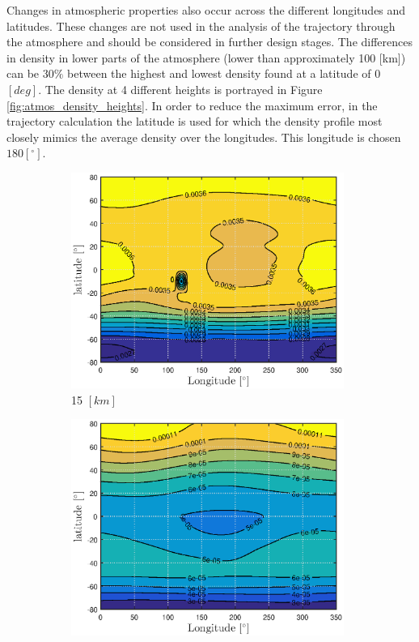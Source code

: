 Changes in atmospheric properties also occur across the different longitudes and latitudes. These changes are not used in the analysis of the trajectory through the atmosphere and should be considered in further design stages. The differences in density in lower parts of the atmosphere (lower than approximately 100 [km]) can be $30\%$ between the highest and lowest density found at a latitude of 0 $[deg]$. The density at 4 different heights is portrayed in Figure \ref{fig:atmos_density_heights}. In order to reduce the maximum error, in the trajectory calculation the latitude is used for which the density profile most closely mimics the average density over the longitudes. This longitude is chosen $180 \left[^\circ\right]$.


\begin{figure}[h]
	\centering
	\begin{subfigure}{0.49\textwidth}
		\centering
		\includegraphics[width=0.98\textwidth]{Figure/Atmosphere/density_15km.eps}
		\caption{15 $[km]$} 
		\label{fig:atmos_rho_15km}
	\end{subfigure}
	\begin{subfigure}{0.49\textwidth}
		\centering
		\includegraphics[width=0.98\textwidth]{Figure/Atmosphere/density_50km.eps}

\end{subfigure}
\end{figure}
